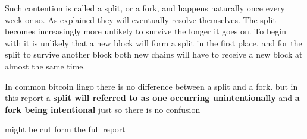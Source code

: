 Such contention is called a split, or a fork, and happens naturally once every week or so. As explained they will eventually resolve themselves. The split becomes increasingly more unlikely to survive the longer it goes on. To begin with it is unlikely that a new block will form a split in the first place, and for the split to survive another block both new chains will have to receive a new block at almost the same time.

In common bitcoin lingo there is no difference between a split and a fork. but in this report a \textbf{split will referred to as one occurring unintentionally} and \textbf{a fork being intentional} just so there is no confusion

\lipsum[1-2]

might be cut form the full report

